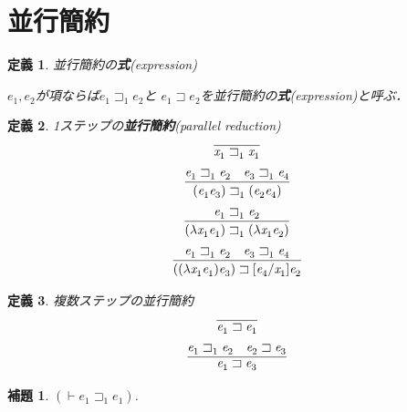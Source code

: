 \documentclass{ltjsbook}%
\newtheorem{lemma}{補題}[section]%
\newtheorem{definition}{定義}[section]%
\newcommand\term[2]{\textbf{#1}{(\textit{#2})}}%
\begin{document}
\section{並行簡約}%
\label{sect:par}%
\begin{definition}%
並行簡約の\term{式}{expression}%
\par$\mathit{e}_1^{},\mathit{e}_2^{}$が項ならば$\mathit{e}_1^{}\sqsupset_1^{}\mathit{e}_2^{}$と%
$\mathit{e}_1^{}\sqsupset\mathit{e}_2^{}$を並行簡約の\term{式}{expression}と呼ぶ．%
\end{definition}%
\begin{definition}%
1ステップの\term{並行簡約}{parallel reduction}%
\begin{equation}%
  \infer{%
    \mathit{x}_1^{}\sqsupset_1^{}\mathit{x}_1^{}%
  }{%
  }%
\end{equation}%
\begin{equation}%
  \infer{%
    (\mathit{e}_1^{}\mathit{e}_3^{})\sqsupset_1^{}(\mathit{e}_2^{}\mathit{e}_4^{})%
  }{%
    \mathit{e}_1^{}\sqsupset_1^{}\mathit{e}_2^{}%
  &%
    \mathit{e}_3^{}\sqsupset_1^{}\mathit{e}_4^{}%
  }%
\end{equation}%
\begin{equation}%
  \infer{%
    (\lambda\mathit{x}_1^{}\mathit{e}_1^{})\sqsupset_1^{}%
    (\lambda\mathit{x}_1^{}\mathit{e}_2^{})%
  }{%
    \mathit{e}_1^{}\sqsupset_1^{}\mathit{e}_2^{}%
  }%
\end{equation}%
\begin{equation}%
  \infer{%
    ((\lambda\mathit{x}_1^{}\mathit{e}_1^{})\mathit{e}_3^{})\sqsupset%
    [\mathit{e}_4^{}/\mathit{x}_1^{}]\mathit{e}_2^{}%
  }{%
    \mathit{e}_1^{}\sqsupset_1^{}\mathit{e}_2^{}%
  &%
    \mathit{e}_3^{}\sqsupset_1^{}\mathit{e}_4^{}%
  }%
\end{equation}%
\end{definition}%
\begin{definition}%
複数ステップの並行簡約%
\begin{equation}%
  \infer{%
    \mathit{e}_1^{}\sqsupset\mathit{e}_1^{}%
  }{%
  }%
\end{equation}%
\begin{equation}%
  \infer{%
    \mathit{e}_1^{}\sqsupset\mathit{e}_3^{}%
  }{%
    \mathit{e}_1^{}\sqsupset_1^{}\mathit{e}_2^{}%
  &%
    \mathit{e}_2^{}\sqsupset\mathit{e}_3^{}%
  }%
\end{equation}%
\end{definition}%
\begin{lemma}%
  \label{lemma:par1_reduct_id}%
  $(\vdash\mathit{e}_1^{}\sqsupset_1^{}\mathit{e}_1^{})$.%
\end{lemma}%
\end{document}
